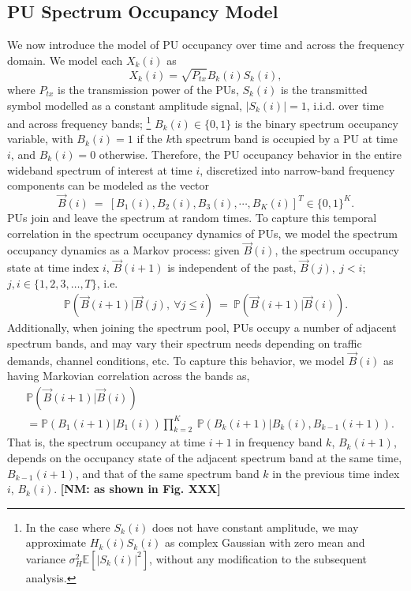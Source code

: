 \documentclass[10pt,twocolumn]{IEEEtran}
\newcommand{\nm}[1]{{\color{blue}\bf{[NM: #1]}}}
\begin{document}
\subsection{PU Spectrum Occupancy Model}
We now introduce the model of PU occupancy over time and across the frequency domain. We model each $X_k(i)$ as 
\begin{equation}\label{4}
    X_k(i)=\sqrt{P_{tx}}B_k(i)S_k(i),
\end{equation}
where $P_{tx}$ is the transmission power of the PUs, $S_k(i)$ is the transmitted symbol modelled as a constant amplitude signal, $|S_k(i)|=1$, i.i.d. over time and across frequency bands; \footnote{In the case where $S_k(i)$ does not have constant amplitude, we may approximate $H_{k}(i)S_{k}(i)$ as complex Gaussian with zero mean and variance $\sigma_H^2\mathbb E[|S_{k}(i)|^2]$, without any modification to the subsequent analysis.} $B_k(i)\in\{0,1\}$ is the binary spectrum occupancy variable, with $B_k(i)=1$ if the $k$th spectrum band is occupied by a PU at time $i$, and $B_k(i)=0$ otherwise. Therefore, the PU occupancy behavior in the entire wideband spectrum of interest at time $i$, discretized into narrow-band frequency components can be modeled as the vector 
\begin{equation}\label{5}
    \vec{B}(i)\ =\ [B_1(i),B_2(i),B_3(i),\cdots,B_K(i)]^T \in \{0,1\}^K.
\end{equation}
PUs join and leave the spectrum at random times. To capture this temporal correlation in the spectrum occupancy dynamics of PUs, we model the spectrum occupancy dynamics as a Markov process: given $\vec{B}(i)$, the spectrum occupancy state at time index $i$, $\vec{B}(i+1)$ is independent of the past, $\vec{B}(j),\ j < i$; $j, i \in \{1,2,3,\dots,T\}$, i.e. 
\begin{equation}\label{6}
    \begin{aligned}
        \mathbb{P}(\vec{B}(i+1)|\vec{B}(j),\ \forall j \leq i)\ =\ \mathbb{P}(\vec{B}(i+1)|\vec{B}(i)).
    \end{aligned}
\end{equation}
Additionally, when joining the spectrum pool, PUs occupy a number of adjacent spectrum bands, and may vary their spectrum needs depending on traffic demands, channel conditions, etc. To capture this behavior, we model $\vec{B}(i)$ as having Markovian correlation across the bands as, 
\begin{align}\label{7}
&         \mathbb{P}(\vec{B}(i+1)|\vec{B}(i))\\&=
\nonumber
         \mathbb{P}(B_{1}(i+1)|B_{1}(i))
         \prod_{k=2}^{K}\ \mathbb{P}(B_{k}(i+1)|B_{k}(i),B_{k-1}(i+1)).
\end{align}
That is, the spectrum occupancy at time $i+1$ in frequency band $k$, $B_{k}(i+1)$, depends on the  occupancy state of the adjacent spectrum band at the same time, $B_{k-1}(i+1)$, and that of the same spectrum band $k$ in the previous time index $i$, $B_{k}(i)$.
\nm{as shown in Fig. XXX}
\end{document}
